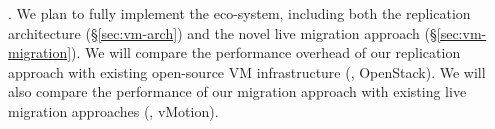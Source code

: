 % 
% 
% 


. We plan to fully implement the eco-system, including both 
the replication architecture (\S\ref{sec:vm-arch}) and the novel live 
migration approach (\S\ref{sec:vm-migration}). We will compare the 
performance overhead of our replication approach with existing open-source VM 
infrastructure (\eg, OpenStack). We will also compare the performance of our 
migration approach with existing live migration approaches (\eg, vMotion).


% 

